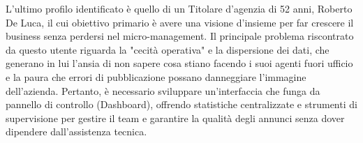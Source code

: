 L'ultimo profilo identificato è quello di un Titolare d'agenzia di 52 anni, Roberto De Luca, il cui 
obiettivo primario è avere una visione d'insieme per far crescere il business senza perdersi nel 
micro-management. Il principale problema riscontrato da questo utente riguarda la "cecità operativa" 
e la dispersione dei dati, che generano in lui l'ansia di non sapere cosa stiano facendo i suoi agenti 
fuori ufficio e la paura che errori di pubblicazione possano danneggiare l'immagine dell'azienda. 
Pertanto, è necessario sviluppare un'interfaccia che funga da pannello di controllo (Dashboard), 
offrendo statistiche centralizzate e strumenti di supervisione per gestire il team e garantire la 
qualità degli annunci senza dover dipendere dall'assistenza tecnica.

